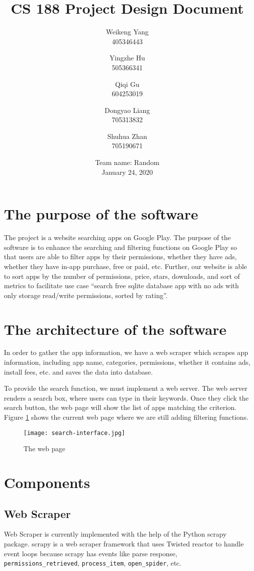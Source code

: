 \documentclass[12pt, a4paper]{article}
\title{CS 188 Project Design Document}
\author{Weikeng Yang\\405346443 \and
Yingzhe Hu\\505366341 \and
Qiqi Gu\\604253019 \and
Dongyao Liang\\705313832 \and
Shuhua Zhan\\705190671}
\date{Team name: Random\\[2mm]January 24, 2020}
\newcommand{\code}[1]{\texttt{#1}}
\begin{document}
\maketitle

\section{The purpose of the software}
The project is a website searching apps on Google Play. The purpose of the software is to enhance the searching and filtering functions on Google Play so that users are able to filter apps by their permissions, whether they have ads, whether they have in-app purchase, free or paid, etc. Further, our website is able to sort apps by the number of permissions, price, stars, downloads, and sort of metrics to facilitate use case “search free sqlite database app with no ads with only storage read/write permissions, sorted by rating”.

\section{The architecture of the software}
In order to gather the app information, we have a web scraper which scrapes app information, including app name, categories, permissions, whether it contains ads, install fees, etc. and saves the data into database. 

To provide the search function, we must implement a web server. The web server renders a search box, where users can type in their keywords. Once they click the search button, the web page will show the list of apps matching the criterion. Figure \ref{fig:search-interface} shows the current web page where we are still adding filtering functions.

\begin{figure}[ht]
\centering
\texttt{[image: search-interface.jpg]}
\caption{The web page}
\label{fig:search-interface}
\end{figure}

\section{Components}
\subsection{Web Scraper}
Web Scraper is currently implemented with the help of the Python scrapy package\textsuperscript{\cite{scrapy}}. scrapy is a web scraper framework that uses Twisted reactor\textsuperscript{\cite{reactor}} to handle event loops because scrapy has events like parse response, \code{permissions\linebreak[2]\_retrieved}, \code{process\_item}, \code{open\_spider}, etc.
\end{document}
